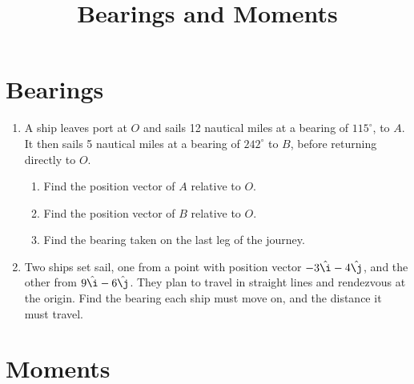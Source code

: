 \documentclass{article}
\newcommand{\ihat}{\hat{\i}}
\newcommand{\jhat}{\hat{\j}}
\begin{document}
\title{Bearings and Moments}
\date{}

\maketitle
\thispagestyle{empty}

\Large


\section{Bearings}


\begin{enumerate}
	\item A ship leaves port at $O$ and sails 12 nautical miles at a bearing of $115^\circ$, to $A$. It then sails 5 nautical miles at a bearing of $242^\circ$ to $B$, before returning directly to $O$.
		\begin{enumerate}
			\item Find the position vector of $A$ relative to $O$.
			\item Find the position vector of $B$ relative to $O$.
			\item Find the bearing taken on the last leg of the journey.
		\end{enumerate}
	\item Two ships set sail, one from a point with position vector $-3\ihat-4\jhat$, and the other from $9\ihat-6\jhat$. They plan to travel in straight lines and rendezvous at the origin. Find the bearing each ship must move on, and the distance it must travel.
\end{enumerate}

\clearpage


\section{Moments}
\end{document}
